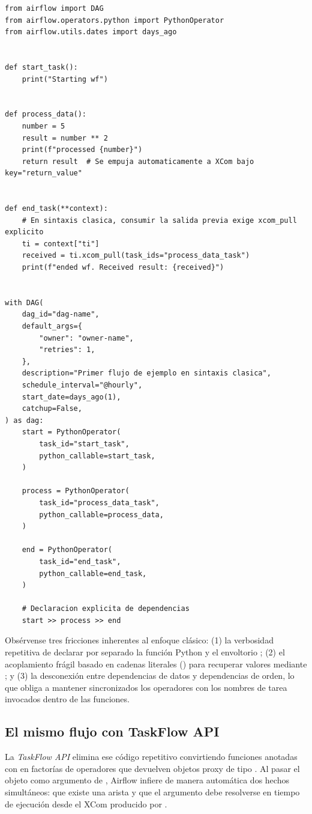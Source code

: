 \begin{lstlisting}[style=python, caption={Definición de un DAG en sintaxis clásica de Airflow 2.x con \code{PythonOperator}.}, label={lst:dag-clasico}]
from airflow import DAG
from airflow.operators.python import PythonOperator
from airflow.utils.dates import days_ago


def start_task():
    print("Starting wf")


def process_data():
    number = 5
    result = number ** 2
    print(f"processed {number}")
    return result  # Se empuja automaticamente a XCom bajo key="return_value"


def end_task(**context):
    # En sintaxis clasica, consumir la salida previa exige xcom_pull explicito
    ti = context["ti"]
    received = ti.xcom_pull(task_ids="process_data_task")
    print(f"ended wf. Received result: {received}")


with DAG(
    dag_id="dag-name",
    default_args={
        "owner": "owner-name",
        "retries": 1,
    },
    description="Primer flujo de ejemplo en sintaxis clasica",
    schedule_interval="@hourly",
    start_date=days_ago(1),
    catchup=False,
) as dag:
    start = PythonOperator(
        task_id="start_task",
        python_callable=start_task,
    )

    process = PythonOperator(
        task_id="process_data_task",
        python_callable=process_data,
    )

    end = PythonOperator(
        task_id="end_task",
        python_callable=end_task,
    )

    # Declaracion explicita de dependencias
    start >> process >> end
\end{lstlisting}

Obsérvense tres fricciones inherentes al enfoque clásico: (1) la verbosidad repetitiva de declarar por separado la función Python y el envoltorio ; (2) el acoplamiento frágil basado en cadenas literales () para recuperar valores mediante ; y (3) la desconexión entre dependencias de datos y dependencias de orden, lo que obliga a mantener sincronizados los operadores \code{>>} con los nombres de tarea invocados dentro de las funciones.

\subsection{El mismo flujo con TaskFlow API}

La \textit{TaskFlow API} elimina ese código repetitivo convirtiendo funciones anotadas con  en factorías de operadores que devuelven objetos proxy de tipo . Al pasar el objeto  como argumento de , Airflow infiere de manera automática dos hechos simultáneos: que existe una arista  y que el argumento  debe resolverse en tiempo de ejecución desde el XCom producido por .

